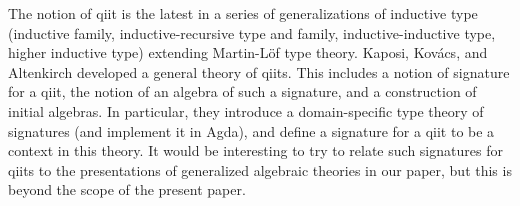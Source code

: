 \documentclass{lmcs}
\newcommand{\FYI}[1]{{\color{red}#1}}
\begin{document}
%


The notion of qiit is the latest in a series of generalizations of inductive type (inductive family, inductive-recursive type and family, inductive-inductive type, higher inductive type) extending Martin-Löf type theory. Kaposi, Kov{\'{a}}cs, and Altenkirch \cite{kaposi:qiits} developed a general theory of qiits. This includes a notion of signature for a qiit, the notion of an algebra of such a signature, and a construction of initial algebras. In particular, they introduce a domain-specific type theory of signatures (and implement it in Agda), and define a signature for a qiit to be a context in this theory. It would be interesting to try to relate such signatures for qiits to the \FYI{presentations} of generalized algebraic theories in our paper, but this is beyond the scope of the present paper.
\end{document}
